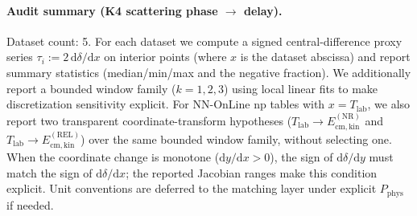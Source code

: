 \paragraph{Audit summary (K4 scattering phase $\to$ delay).} \AuditTag Dataset count: 5. For each dataset we compute a signed central-difference proxy series $\tau_i:=2\,\mathrm{d}\delta/\mathrm{d}x$ on interior points (where $x$ is the dataset abscissa) and report summary statistics (median/min/max and the negative fraction). We additionally report a bounded window family ($k=1,2,3$) using local linear fits to make discretization sensitivity explicit. For NN-OnLine np tables with $x=T_{\mathrm{lab}}$, we also report two transparent coordinate-transform hypotheses ($T_{\mathrm{lab}}\to E_{\mathrm{cm,kin}}^{(\mathrm{NR})}$ and $T_{\mathrm{lab}}\to E_{\mathrm{cm,kin}}^{(\mathrm{REL})}$) over the same bounded window family, without selecting one. When the coordinate change is monotone ($\mathrm{d}y/\mathrm{d}x>0$), the sign of $\mathrm{d}\delta/\mathrm{d}y$ must match the sign of $\mathrm{d}\delta/\mathrm{d}x$; the reported Jacobian ranges make this condition explicit. Unit conventions are deferred to the matching layer under explicit $P_{\mathrm{phys}}$ if needed.